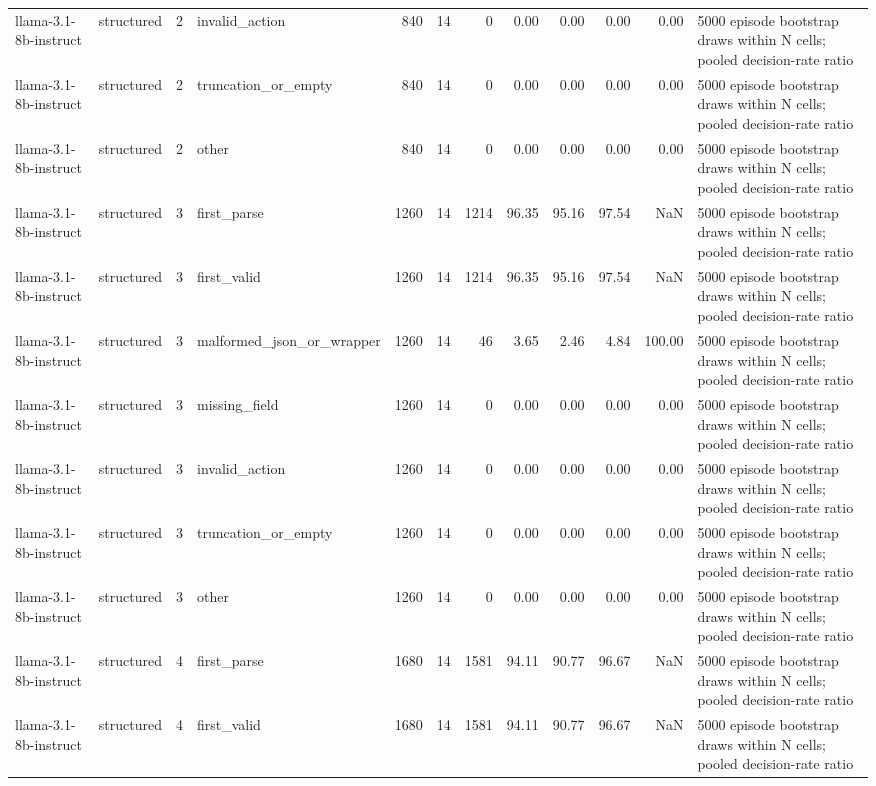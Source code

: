 \begin{tabular}{llllrrrrrrrl}
llama-3.1-8b-instruct & structured & 2 & invalid\_action & 840 & 14 & 0 & 0.00 & 0.00 & 0.00 & 0.00 & 5000 episode bootstrap draws within N cells; pooled decision-rate ratio \\
llama-3.1-8b-instruct & structured & 2 & truncation\_or\_empty & 840 & 14 & 0 & 0.00 & 0.00 & 0.00 & 0.00 & 5000 episode bootstrap draws within N cells; pooled decision-rate ratio \\
llama-3.1-8b-instruct & structured & 2 & other & 840 & 14 & 0 & 0.00 & 0.00 & 0.00 & 0.00 & 5000 episode bootstrap draws within N cells; pooled decision-rate ratio \\
llama-3.1-8b-instruct & structured & 3 & first\_parse & 1260 & 14 & 1214 & 96.35 & 95.16 & 97.54 & NaN & 5000 episode bootstrap draws within N cells; pooled decision-rate ratio \\
llama-3.1-8b-instruct & structured & 3 & first\_valid & 1260 & 14 & 1214 & 96.35 & 95.16 & 97.54 & NaN & 5000 episode bootstrap draws within N cells; pooled decision-rate ratio \\
llama-3.1-8b-instruct & structured & 3 & malformed\_json\_or\_wrapper & 1260 & 14 & 46 & 3.65 & 2.46 & 4.84 & 100.00 & 5000 episode bootstrap draws within N cells; pooled decision-rate ratio \\
llama-3.1-8b-instruct & structured & 3 & missing\_field & 1260 & 14 & 0 & 0.00 & 0.00 & 0.00 & 0.00 & 5000 episode bootstrap draws within N cells; pooled decision-rate ratio \\
llama-3.1-8b-instruct & structured & 3 & invalid\_action & 1260 & 14 & 0 & 0.00 & 0.00 & 0.00 & 0.00 & 5000 episode bootstrap draws within N cells; pooled decision-rate ratio \\
llama-3.1-8b-instruct & structured & 3 & truncation\_or\_empty & 1260 & 14 & 0 & 0.00 & 0.00 & 0.00 & 0.00 & 5000 episode bootstrap draws within N cells; pooled decision-rate ratio \\
llama-3.1-8b-instruct & structured & 3 & other & 1260 & 14 & 0 & 0.00 & 0.00 & 0.00 & 0.00 & 5000 episode bootstrap draws within N cells; pooled decision-rate ratio \\
llama-3.1-8b-instruct & structured & 4 & first\_parse & 1680 & 14 & 1581 & 94.11 & 90.77 & 96.67 & NaN & 5000 episode bootstrap draws within N cells; pooled decision-rate ratio \\
llama-3.1-8b-instruct & structured & 4 & first\_valid & 1680 & 14 & 1581 & 94.11 & 90.77 & 96.67 & NaN & 5000 episode bootstrap draws within N cells; pooled decision-rate ratio \\

\end{tabular}
